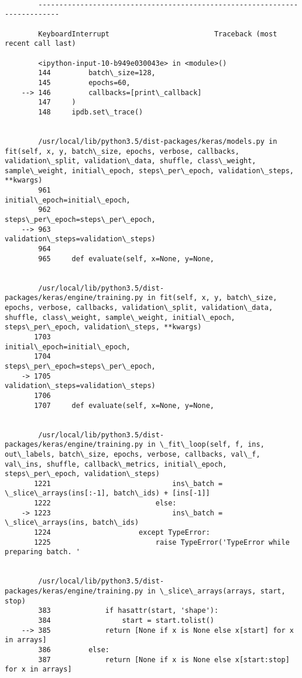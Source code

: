 \documentclass[11pt]{article}
\begin{document}
    \begin{Verbatim}[commandchars=\\\{\}]

        ---------------------------------------------------------------------------

        KeyboardInterrupt                         Traceback (most recent call last)

        <ipython-input-10-b949e030043e> in <module>()
        144         batch\_size=128,
        145         epochs=60,
    --> 146         callbacks=[print\_callback]
        147     )
        148     ipdb.set\_trace()


        /usr/local/lib/python3.5/dist-packages/keras/models.py in fit(self, x, y, batch\_size, epochs, verbose, callbacks, validation\_split, validation\_data, shuffle, class\_weight, sample\_weight, initial\_epoch, steps\_per\_epoch, validation\_steps, **kwargs)
        961                               initial\_epoch=initial\_epoch,
        962                               steps\_per\_epoch=steps\_per\_epoch,
    --> 963                               validation\_steps=validation\_steps)
        964 
        965     def evaluate(self, x=None, y=None,


        /usr/local/lib/python3.5/dist-packages/keras/engine/training.py in fit(self, x, y, batch\_size, epochs, verbose, callbacks, validation\_split, validation\_data, shuffle, class\_weight, sample\_weight, initial\_epoch, steps\_per\_epoch, validation\_steps, **kwargs)
       1703                               initial\_epoch=initial\_epoch,
       1704                               steps\_per\_epoch=steps\_per\_epoch,
    -> 1705                               validation\_steps=validation\_steps)
       1706 
       1707     def evaluate(self, x=None, y=None,


        /usr/local/lib/python3.5/dist-packages/keras/engine/training.py in \_fit\_loop(self, f, ins, out\_labels, batch\_size, epochs, verbose, callbacks, val\_f, val\_ins, shuffle, callback\_metrics, initial\_epoch, steps\_per\_epoch, validation\_steps)
       1221                             ins\_batch = \_slice\_arrays(ins[:-1], batch\_ids) + [ins[-1]]
       1222                         else:
    -> 1223                             ins\_batch = \_slice\_arrays(ins, batch\_ids)
       1224                     except TypeError:
       1225                         raise TypeError('TypeError while preparing batch. '


        /usr/local/lib/python3.5/dist-packages/keras/engine/training.py in \_slice\_arrays(arrays, start, stop)
        383             if hasattr(start, 'shape'):
        384                 start = start.tolist()
    --> 385             return [None if x is None else x[start] for x in arrays]
        386         else:
        387             return [None if x is None else x[start:stop] for x in arrays]



\end{Verbatim}
\end{document}
